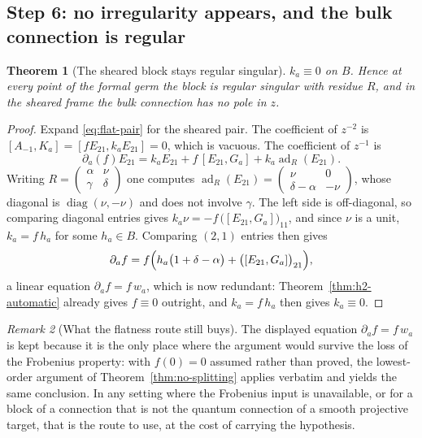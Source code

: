 \documentclass[11pt]{article}
\newtheorem{theorem}{Theorem}
\theoremstyle{definition}
\theoremstyle{remark}
\newtheorem{remark}[theorem]{Remark}
\begin{document}
\subsection*{Step 6: no irregularity appears, and the bulk connection is regular}

\begin{theorem}[The sheared block stays regular singular]
\label{thm:no-irregularity}
$k_a\equiv0$ on $B$. Hence at every point of the formal germ the block is
regular singular with residue $R$, and in the sheared frame the bulk connection
has no pole in $z$.
\end{theorem}

\begin{proof}
Expand \eqref{eq:flat-pair} for the sheared pair. The coefficient of $z^{-2}$ is
$[A_{-1},K_a]=[fE_{21},k_aE_{21}]=0$, which is vacuous. The coefficient of
$z^{-1}$ is
\[
  \partial_a(f)E_{21}
  =k_aE_{21}+f\,[E_{21},G_a]+k_a\operatorname{ad}_R(E_{21}).
\]
Writing $R=\begin{pmatrix}\alpha&\nu\\\gamma&\delta\end{pmatrix}$ one computes
$\operatorname{ad}_R(E_{21})
=\begin{pmatrix}\nu&0\\\delta-\alpha&-\nu\end{pmatrix}$, whose diagonal is
$\operatorname{diag}(\nu,-\nu)$ and does not involve $\gamma$. The left side is
off-diagonal, so comparing diagonal entries gives
$k_a\nu=-f\,\bigl([E_{21},G_a]\bigr)_{11}$, and since $\nu$ is a unit,
$k_a=f\,h_a$ for some $h_a\in B$. Comparing $(2,1)$ entries then gives
\[
  \partial_af=f\Bigl(h_a\bigl(1+\delta-\alpha\bigr)
  +\bigl([E_{21},G_a]\bigr)_{21}\Bigr),
\]
a linear equation $\partial_af=f\,w_a$, which is now redundant:
Theorem~\ref{thm:h2-automatic} already gives $f\equiv0$ outright, and
$k_a=f\,h_a$ then gives $k_a\equiv0$.
\end{proof}

\begin{remark}[What the flatness route still buys]
The displayed equation $\partial_af=f\,w_a$ is kept because it is the only
place where the argument would survive the loss of the Frobenius property: with
$f(0)=0$ assumed rather than proved, the lowest-order argument of
Theorem~\ref{thm:no-splitting} applies verbatim and yields the same conclusion.
In any setting where the Frobenius input is unavailable, or for a block of a
connection that is not the quantum connection of a smooth projective target,
that is the route to use, at the cost of carrying the hypothesis.
\end{remark}
\end{document}
